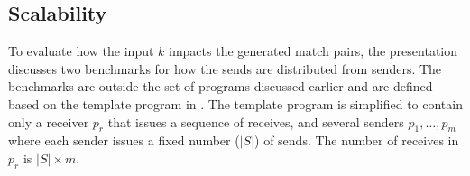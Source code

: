  





\subsection{Scalability}
To evaluate how the input $k$ impacts the generated match pairs, the presentation discusses two benchmarks for how the sends are distributed from senders. The benchmarks are outside the set of programs discussed earlier and are defined based on the template program in . The template program is simplified to contain only a receiver $p_r$ that issues a sequence of receives, and several senders $p_1,\ldots,p_m$ where each sender issues a fixed number ($|S|$) of sends. The number of receives in $p_r$ is $|S|\times m$.

\examplefigtemplate


